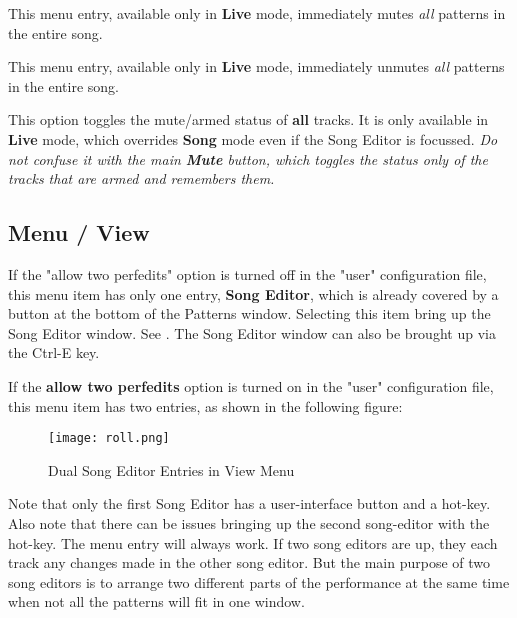    This menu entry, available only in \textbf{Live} mode,
   immediately mutes \textsl{all} patterns in the entire song.

   This menu entry, available only in \textbf{Live} mode,
   immediately unmutes \textsl{all} patterns in the entire song.

   This option toggles the mute/armed status of \textbf{all} tracks.
   It is only available in \textbf{Live} mode, which overrides \textbf{Song}
   mode even if the Song Editor is focussed.
   \textsl{Do not confuse it with the main \textbf{Mute} button, which toggles the
   status only of the tracks that are armed and remembers them.}

\subsection{Menu / View}
\label{subsec:seq66_menu_view}

   If the "allow two perfedits" option is turned off in the "user"
   configuration file, this menu item has only one entry, \textbf{Song Editor}, 
   which is already covered by a button at the bottom of the Patterns
   window.  Selecting this item bring up the Song Editor window.
   See .
   The Song Editor window can also be brought up via the
   Ctrl-E key.

   If the \textbf{allow two perfedits} option is turned on in the "user"
   configuration file, this menu item has two entries,
   as shown in the following figure:

\begin{figure}[H]
   \centering 
   \texttt{[image: roll.png]}
   \caption{Dual Song Editor Entries in View Menu}
   \label{fig:seq66_menu_view_song_editors}
\end{figure}

   Note that only the first Song Editor has a user-interface button and
   a hot-key.  Also note that there can be issues bringing up the second
   song-editor with the hot-key.  The menu entry will always work.
   If two song editors are up, they each track any changes made in the other
   song editor.  But the main purpose of two song editors is to arrange two
   different parts of the performance at the same time when not all the
   patterns will fit in one window.

